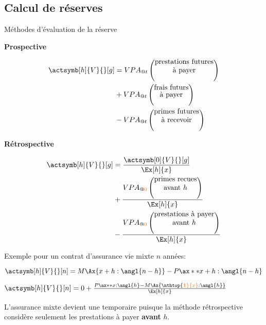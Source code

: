 \documentclass[10pt, french]{article}
\begin{document}
\begin{multicols*}{2}
\subsection{Calcul de réserves}
\begin{conceptgen}{Méthodes d'évaluation de la réserve}
\setlength{\mathindent}{-1.5cm}
\begin{minipage}[t]{0.5\columnwidth}
\begin{center}
	\textbf{Prospective}
\end{center}
\begin{align*}
	\actsymb[h]{V}{}[g]
	&=	VPA_{@t}\left(\shortstack{prestations futures\\ à payer}\right)\\	 
		&+	VPA_{@t}\left(\shortstack{frais futurs\\ à payer}\right)\\ 
		&- 	VPA_{@t}\left(\shortstack{primes futures\\ à recevoir}\right)
\end{align*}
\end{minipage}
\setlength{\mathindent}{-0.5cm}
\begin{minipage}[t]{0.5\columnwidth}
\begin{center}
	\textbf{Rétrospective}
\end{center}
\begin{align*}
	\actsymb[h]{V}{}[g]
	&=	\frac{\actsymb[0]{V}{}[g]}{\Ex[h]{x}}	\\
		&+ 	\frac{VPA_{@\textcolor{orange}{0}}\left(\shortstack{primes recues\\ avant $h$}\right)}{\Ex[h]{x}}	\\
		&- 	\frac{VPA_{@\textcolor{orange}{0}}\left(\shortstack{prestations à payer\\ avant $h$}\right)}{\Ex[h]{x}}
\end{align*}
\end{minipage}
\setlength{\mathindent}{1cm}

\tcbline

Exemple pour un contrat d'assurance vie mixte $n$ années:
\begin{description}
	\item[Méthode prospective]	$\actsymb[h]{V}{}[n]	=	M \Ax{x + h: \angl{n - h}} - P \ax**{x + h: \angl{n - h}}$
	\item[Méthode rétrospective]	$\actsymb[h]{V}{}[n]	=	0 + \frac{P \ax**{x:\angl{h}} - M\Ax{\nthtop{\color{orange}\textbf{1}}{x}:\angl{h}}}{\Ex[h]{x}}$
	\item	L'assurance mixte devient une temporaire puisque la méthode rétrospective considère seulement les prestations à payer {\color{orange}\textbf{avant}} $h$.
\end{description}


\end{conceptgen}
\end{multicols*}
\end{document}
